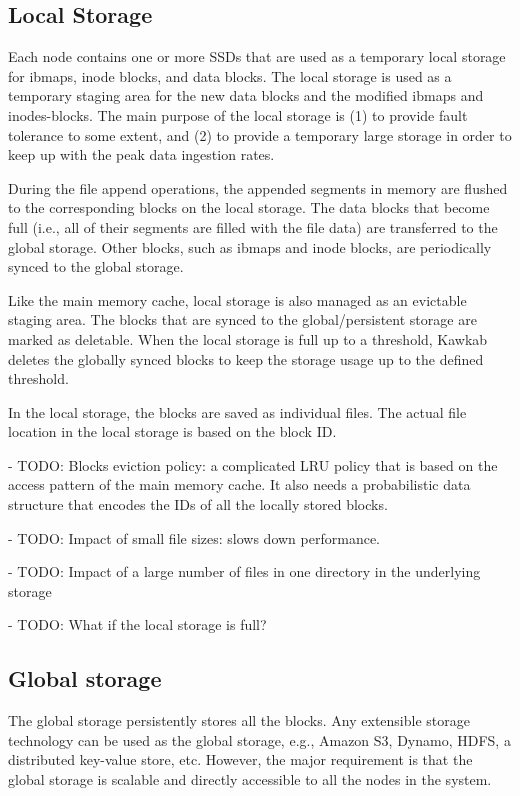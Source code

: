 \documentclass[]{article}
\begin{document}
\subsection{Local Storage} Each node contains one or more SSDs that are used as
a temporary local storage for ibmaps, inode blocks, and data blocks.  The local
storage is used as a temporary staging area for the new data blocks and the
modified ibmaps and inodes-blocks.  The main purpose of the local storage is
(1) to provide fault tolerance to some extent, and (2) to provide a temporary 
large storage in order to keep up with the peak data ingestion rates.

During the file append operations, the appended segments in memory are flushed
to the corresponding blocks on the local storage.  The data blocks that become
full (i.e., all of their segments are filled with the file data)
are transferred to the global storage.  Other blocks, such as ibmaps and
inode blocks, are periodically synced to the global storage.

Like the main memory cache, local storage is also managed as an evictable
staging area. The blocks that are synced to the global/persistent storage are
marked as deletable. When the local storage is full up to a threshold, Kawkab
deletes the globally synced blocks to keep the storage usage up to
the defined threshold.

In the local storage, the blocks are saved as individual files. The actual
file location in the local storage is based on the block ID.

- TODO: Blocks eviction policy: a complicated LRU policy that is based on the
  access pattern of the main memory cache. It also needs a probabilistic
  data structure that encodes the IDs of all the locally stored blocks.

- TODO: Impact of small file sizes: slows down performance.

- TODO: Impact of a large number of files in one directory in the underlying storage

- TODO: What if the local storage is full?


\subsection{Global storage}

The global storage persistently stores all the blocks. Any extensible storage
technology can be used as the global storage, e.g., Amazon S3, Dynamo, HDFS, a
distributed key-value store, etc. However, the major requirement is that the 
global storage is scalable and directly accessible to all the nodes in the system.
\end{document}
